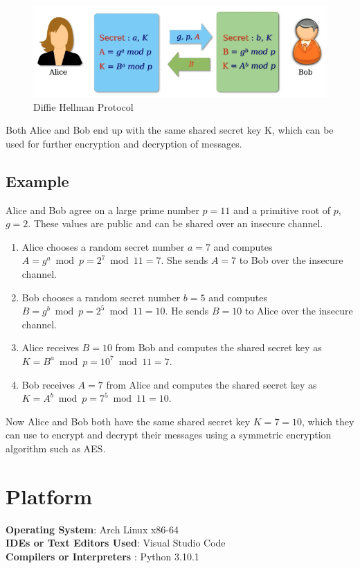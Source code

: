 \documentclass[11pt]{article}
\begin{document}
\begin{figure}[H]
    \centering
    \includegraphics[width=.85\textwidth]{dh.png}
    \caption{Diffie Hellman Protocol}
\end{figure}

Both Alice and Bob end up with the same shared secret key K, which can be used for further encryption and decryption of messages.

\subsection{Example}
Alice and Bob agree on a large prime number $p=11$ and a primitive root of $p$, $g=2$. These values are public and can be shared over an insecure channel.

\begin{enumerate}
    \item Alice chooses a random secret number $a=7$ and computes $A = g^a \bmod p = 2^7 \bmod 11 = 7$. She sends $A=7$ to Bob over the insecure channel.
    \item Bob chooses a random secret number $b=5$ and computes $B = g^b \bmod p = 2^5 \bmod 11 = 10$. He sends $B=10$ to Alice over the insecure channel.
    \item Alice receives $B=10$ from Bob and computes the shared secret key as $K = B^a \bmod p = 10^7 \bmod 11 = 7$.
    \item Bob receives $A=7$ from Alice and computes the shared secret key as $K = A^b \bmod p = 7^5 \bmod 11 = 10$.
\end{enumerate}

Now Alice and Bob both have the same shared secret key $K=7=10$, which they can use to encrypt and decrypt their messages using a symmetric encryption algorithm such as AES.




\section{Platform}
\textbf{\textbf{Operating System}}: Arch Linux x86-64 \\
\textbf{\textbf{IDEs or Text Editors Used}}: Visual Studio Code\\
\textbf{\textbf{Compilers or Interpreters} }: Python 3.10.1\\
\end{document}
